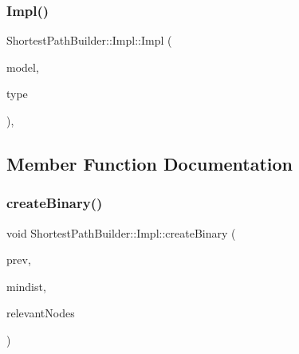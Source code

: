 \subsubsection{\texorpdfstring{Impl()}{Impl()}}
{\footnotesize\ttfamily Shortest\+Path\+Builder\+::\+Impl\+::\+Impl (\begin{DoxyParamCaption}\item[{\mbox{\hyperlink{class_displace_model}{Displace\+Model}} $\ast$}]{model,  }\item[{\mbox{\hyperlink{class_shortest_path_builder_a1ba5dda0ad139bf12f34e1eb552bcb13}{Shortest\+Path\+Builder\+::\+Algo\+Type}}}]{type }\end{DoxyParamCaption})\hspace{0.3cm}{\ttfamily [inline]}, {\ttfamily [explicit]}}



\subsection{Member Function Documentation}
\mbox{\label{struct_shortest_path_builder_1_1_impl_a6f3f909f1eef789e3a4dd7dcc7734b66}} 
\subsubsection{\texorpdfstring{createBinary()}{createBinary()}}
{\footnotesize\ttfamily void Shortest\+Path\+Builder\+::\+Impl\+::create\+Binary (\begin{DoxyParamCaption}\item[{Q\+String}]{prev,  }\item[{Q\+String}]{mindist,  }\item[{const Q\+List$<$ std\+::shared\+\_\+ptr$<$ \mbox{\hyperlink{class_node_data}{Node\+Data}} $>$ $>$ \&}]{relevant\+Nodes }\end{DoxyParamCaption})\hspace{0.3cm}{\ttfamily [inline]}}

\mbox{\label{struct_shortest_path_builder_1_1_impl_adeedcada797100857b8101e9dd8aba20}} 
